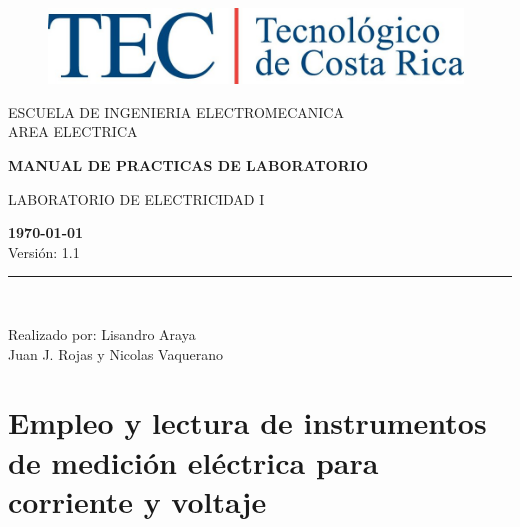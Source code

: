 \documentclass{report}
\begin{document}
\begin{titlepage}

\begin{center}
\vspace*{-1in}
\begin{figure}[htb]
\begin{center}
\includegraphics[width=11cm]{logo}
\end{center}
\end{figure}
\vspace*{0.4in}
\begin{Large}
ESCUELA DE INGENIERIA ELECTROMECANICA\\
\vspace*{0.15in}
AREA ELECTRICA\\
\vspace*{0.8in}
\end{Large}
\vspace*{0.2in}
\begin{Large}
\textbf{MANUAL DE PRACTICAS DE LABORATORIO} \\
\end{Large}
\vspace*{0.3in}
\begin{large}
LABORATORIO DE ELECTRICIDAD I\\
\end{large}
\vspace*{2.5in}
\begin{Large}
\textbf{\today}\\
Versión: 1.1\\
\end{Large}
\rule{80mm}{0.1mm}\\
\vspace*{0.1in}
\begin{large}
Realizado por: Lisandro Araya \\
Juan J. Rojas y Nicolas Vaquerano\\
\end{large}
\end{center}

\end{titlepage}

\tableofcontents

\chapter{Empleo y lectura de instrumentos de medición eléctrica para corriente y voltaje}
\end{document}
